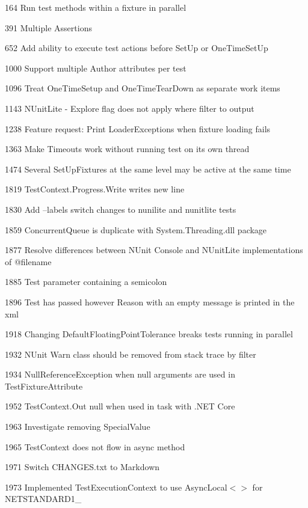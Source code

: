 \begin{DoxyItemize}
\item 164 Run test methods within a fixture in parallel
\item 391 Multiple Assertions
\item 652 Add ability to execute test actions before Set\+Up or One\+Time\+Set\+Up
\item 1000 Support multiple Author attributes per test
\item 1096 Treat One\+Time\+Setup and One\+Time\+Tear\+Down as separate work items
\item 1143 N\+Unit\+Lite -\/ Explore flag does not apply where filter to output
\item 1238 Feature request\+: Print Loader\+Exceptions when fixture loading fails
\item 1363 Make Timeouts work without running test on its own thread
\item 1474 Several Set\+Up\+Fixtures at the same level may be active at the same time
\item 1819 Test\+Context.\+Progress.\+Write writes new line
\item 1830 Add --labels switch changes to nunilite and nunitlite tests
\item 1859 Concurrent\+Queue is duplicate with System.\+Threading.\+dll package
\item 1877 Resolve differences between N\+Unit Console and N\+Unit\+Lite implementations of @filename
\item 1885 Test parameter containing a semicolon
\item 1896 Test has passed however Reason with an empty message is printed in the xml
\item 1918 Changing Default\+Floating\+Point\+Tolerance breaks tests running in parallel
\item 1932 N\+Unit Warn class should be removed from stack trace by filter
\item 1934 Null\+Reference\+Exception when null arguments are used in Test\+Fixture\+Attribute
\item 1952 Test\+Context.\+Out null when used in task with .N\+ET Core
\item 1963 Investigate removing Special\+Value
\item 1965 Test\+Context does not flow in async method
\item 1971 Switch C\+H\+A\+N\+G\+E\+S.\+txt to Markdown
\item 1973 Implemented Test\+Execution\+Context to use Async\+Local$<$$>$ for N\+E\+T\+S\+T\+A\+N\+D\+A\+R\+D1\+\_
$$
\end{DoxyItemize}
